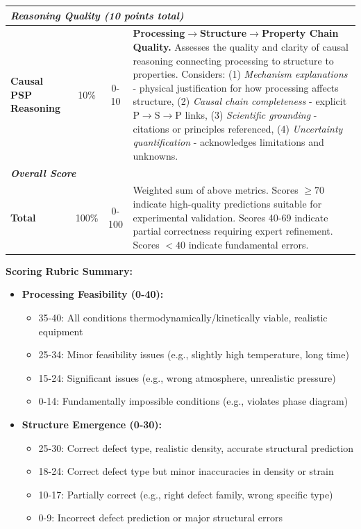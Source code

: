 \begin{table}[ht!]
\begin{tabular}{lccp{9cm}}
\multicolumn{4}{l}{\textit{\textbf{Reasoning Quality (10 points total)}}} \\
\midrule

\textbf{Causal PSP Reasoning} & 10\% & 0-10 &
\textbf{Processing$\rightarrow$Structure$\rightarrow$Property Chain Quality.}
Assesses the quality and clarity of causal reasoning connecting processing to
structure to properties. Considers: (1) \textit{Mechanism explanations} -
physical justification for how processing affects structure,
(2) \textit{Causal chain completeness} - explicit P$\rightarrow$S$\rightarrow$P links,
(3) \textit{Scientific grounding} - citations or principles referenced,
(4) \textit{Uncertainty quantification} - acknowledges limitations and unknowns.
\\
\midrule

\multicolumn{4}{l}{\textit{\textbf{Overall Score}}} \\
\midrule

\textbf{Total} & 100\% & 0-100 &
Weighted sum of above metrics. Scores $\geq 70$ indicate high-quality predictions
suitable for experimental validation. Scores 40-69 indicate partial correctness
requiring expert refinement. Scores $< 40$ indicate fundamental errors.
\\

\bottomrule
\end{tabular}
\vspace{0.3cm}

\noindent\textbf{Scoring Rubric Summary:}
\begin{itemize}[leftmargin=*,noitemsep,topsep=0pt]
    \item \textbf{Processing Feasibility (0-40):}
    \begin{itemize}[noitemsep]
        \item 35-40: All conditions thermodynamically/kinetically viable, realistic equipment
        \item 25-34: Minor feasibility issues (e.g., slightly high temperature, long time)
        \item 15-24: Significant issues (e.g., wrong atmosphere, unrealistic pressure)
        \item 0-14: Fundamentally impossible conditions (e.g., violates phase diagram)
    \end{itemize}

    \item \textbf{Structure Emergence (0-30):}
    \begin{itemize}[noitemsep]
        \item 25-30: Correct defect type, realistic density, accurate structural prediction
        \item 18-24: Correct defect type but minor inaccuracies in density or strain
        \item 10-17: Partially correct (e.g., right defect family, wrong specific type)
        \item 0-9: Incorrect defect prediction or major structural errors
    \end{itemize}


\end{itemize}
\end{table}
